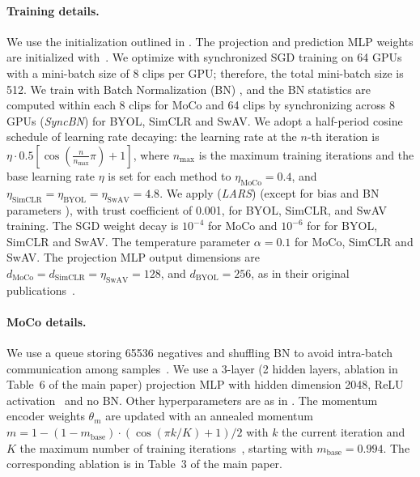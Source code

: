 \documentclass[final]{cvpr}
\begin{document}
\paragraph{Training details.}
We use the initialization outlined in \cite{he2015delving}. The projection and prediction MLP weights are initialized with~\cite{Glorot11}.  We optimize with synchronized SGD training on 64 GPUs with a mini-batch size of 8 clips per GPU; therefore, the total mini-batch size is 512.	
We train with Batch Normalization (BN) \cite{Ioffe15}, and the BN statistics are computed within each 8 clips for MoCo and 64 clips by synchronizing across 8 GPUs (\textit{SyncBN}) for BYOL, SimCLR and SwAV.
We adopt a half-period cosine schedule \cite{Loshchilov2016} of learning rate decaying: the learning rate at the $n$-th iteration is $\eta\cdot0.5[\cos(\frac{n}{n_\text{max}}\pi)+1]$, where $n_\text{max}$ is the maximum training iterations and the base learning rate $\eta$ is set for each method to $\eta_\text{MoCo}=0.4$, and $\eta_\text{SimCLR} = \eta_\text{BYOL} = \eta_\text{SwAV}=4.8$. We apply (\textit{LARS}) \cite{you2017large} (except for bias and BN parameters \cite{Grill2020}), with trust coefficient of 0.001, for BYOL, SimCLR, and SwAV training. The SGD weight decay is $10^{-4}$ for MoCo and $10^{-6}$ for for BYOL, SimCLR  and SwAV.  The temperature parameter $\alpha=0.1$ for MoCo, SimCLR and SwAV. The projection MLP output dimensions are \mbox{$d_\text{MoCo} = d_\text{SimCLR}  = \eta_\text{SwAV}=128$}, and $d_\text{BYOL}=256$, as in their original publications~\cite{He20,Chen20,Caron20,Grill2020}.



\paragraph{MoCo details.} We use a queue storing 65536 negatives and shuffling BN to avoid intra-batch communication among samples~\cite{He20}. We use a 3-layer (2 hidden layers, ablation in  Table~{\color{red}6} of the main paper) projection MLP with hidden dimension 2048, ReLU activation~\cite{Nair10} and no BN. Other hyperparameters are as in \cite{He20,Chen20moco}. The momentum encoder weights  $\theta_m$ are updated with an annealed momentum  \mbox{$m = 1 - (1-m_\text{base})\cdot ({\cos ({\pi k / K}) + 1}) / 2$} with $k$ the current iteration and $K$ the maximum number of training iterations~\cite{Grill2020}, starting with $m_\text{base} = 0.994$. The corresponding ablation is in  Table~{\color{red}3} of the main paper.
\end{document}
